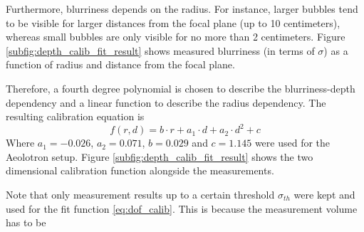 			Furthermore, blurriness depends on the radius. For instance, larger bubbles tend to be visible for larger distances from the focal plane (up to 10 centimeters), whereas small bubbles are only visible for no more than 2 centimeters. Figure \ref{subfig:depth_calib_fit_result} shows measured blurriness (in terms of $\sigma$) as a function of radius and distance from the focal plane. 
			
			Therefore, a fourth degree polynomial is chosen to describe the blurriness-depth dependency and a linear function to describe the radius dependency. The resulting calibration equation is 
			\begin{equation}
				f(r, d) = b \cdot r + a_1 \cdot d + a_2 \cdot d^2 + c
				\label{eq:dof_calib}				
			\end{equation}
			Where $a_1 = -0.026$, $a_2=0.071$, $b=0.029$ and $c=1.145$ were used for the Aeolotron setup. Figure \ref{subfig:depth_calib_fit_result} shows the two dimensional calibration function alongside the measurements. 
			
			Note that only measurement results up to a certain threshold $\sigma_{th}$ were kept and used for the fit function \ref{eq:dof_calib}. This is because the measurement volume has to be 
			
			
			
